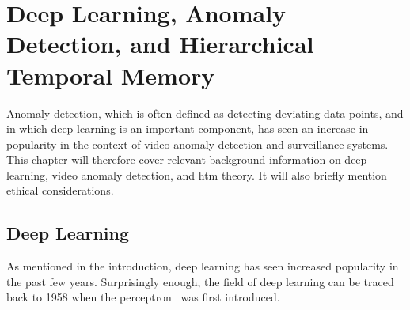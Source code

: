 \chapter{Deep Learning, Anomaly Detection, and Hierarchical Temporal Memory}
\label{sec:background}
Anomaly detection, which is often defined as detecting deviating data points, and in which deep learning is an important component, has seen an increase in popularity in the context of video anomaly detection and surveillance systems. This chapter will therefore cover relevant background information on deep learning, video anomaly detection, and \gls*{htm} theory. It will also briefly mention ethical considerations.
\section{Deep Learning}
As mentioned in the introduction, deep learning has seen increased popularity in the past few years. Surprisingly enough, the field of deep learning can be traced back to 1958 when the perceptron~\cite{perceptron,perceptron2} was first introduced.
